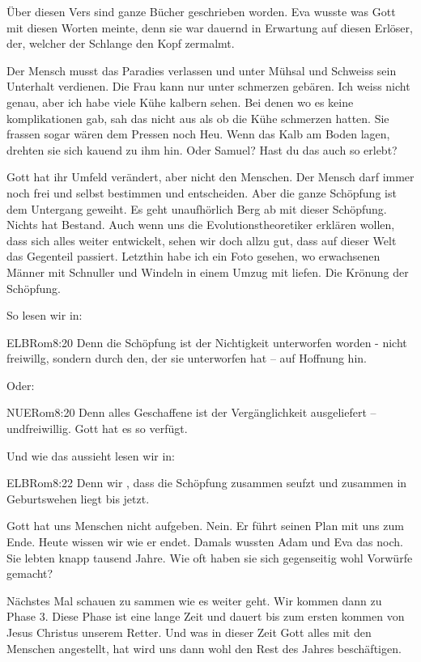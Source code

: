         Über diesen Vers sind ganze Bücher geschrieben worden. Eva wusste was Gott mit diesen Worten meinte, denn sie war dauernd in Erwartung auf diesen Erlöser, der, welcher der Schlange den Kopf zermalmt. 

        Der Mensch musst das Paradies verlassen und unter Mühsal und Schweiss sein Unterhalt verdienen. Die Frau kann nur unter schmerzen gebären. Ich weiss nicht genau, aber ich habe viele Kühe kalbern sehen. Bei denen wo es keine komplikationen gab, sah das nicht aus als ob die Kühe schmerzen hatten. Sie frassen sogar wären dem Pressen noch Heu. Wenn das Kalb am Boden lagen, drehten sie sich kauend zu ihm hin. Oder Samuel? Hast du das auch so erlebt?
        
        Gott hat ihr Umfeld verändert, aber nicht den Menschen. Der Mensch darf immer noch frei und selbst bestimmen und entscheiden.  Aber die ganze Schöpfung ist dem Untergang geweiht. Es geht unaufhörlich Berg ab mit dieser Schöpfung. Nichts hat Bestand. Auch wenn uns die Evolutionstheoretiker erklären wollen, dass sich alles weiter entwickelt, sehen wir doch allzu gut, dass auf dieser Welt das Gegenteil passiert. Letzthin habe ich ein Foto gesehen, wo erwachsenen Männer mit Schnuller und Windeln in einem Umzug mit liefen. Die Krönung der Schöpfung.

       So lesen wir in:
        \begin{bibelquote}{ELB}{Rom}{8:20}
            Denn die Schöpfung ist der Nichtigkeit unterworfen worden - nicht freiwillg, sondern durch den, der sie unterworfen hat -- auf Hoffnung hin.
        \end{bibelquote}
        Oder:
        \begin{bibelquote}{NUE}{Rom}{8:20}
            Denn alles Geschaffene ist der Vergänglichkeit ausgeliefert -- undfreiwillig. Gott hat es so verfügt.
        \end{bibelquote}
        Und wie das aussieht lesen wir in:
        \begin{bibelquote}{ELB}{Rom}{8:22}
            Denn wir , dass die  Schöpfung zusammen seufzt und zusammen in Geburtswehen liegt bis jetzt.
        \end{bibelquote}

        Gott hat uns Menschen nicht aufgeben. Nein. Er führt seinen Plan mit uns zum Ende. Heute wissen wir wie er endet. Damals wussten Adam und Eva das noch. Sie lebten knapp tausend Jahre. Wie oft haben sie sich gegenseitig wohl Vorwürfe gemacht?

        Nächstes Mal schauen zu sammen wie es weiter geht. Wir kommen dann zu Phase 3. Diese Phase ist eine lange Zeit und dauert bis zum ersten kommen von Jesus Christus unserem Retter. Und was in dieser Zeit Gott alles mit den Menschen angestellt, hat wird uns dann wohl den Rest des Jahres beschäftigen.
